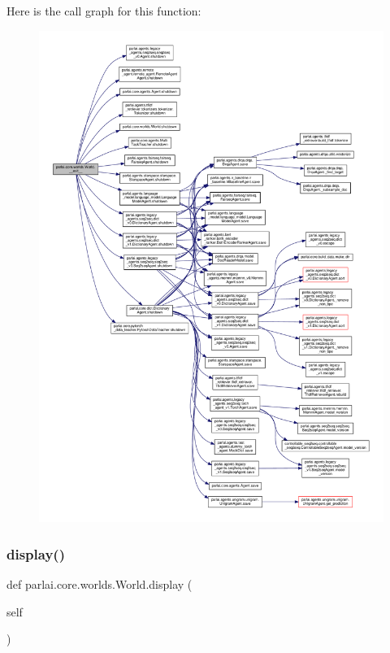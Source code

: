 Here is the call graph for this function\+:
\nopagebreak
\begin{figure}[H]
\begin{center}
\leavevmode
\includegraphics[width=350pt]{classparlai_1_1core_1_1worlds_1_1World_ae2b8ea006564cbefbe8520f45fb71040_cgraph}
\end{center}
\end{figure}
\mbox{\label{classparlai_1_1core_1_1worlds_1_1World_a147371097765449933ca963215eba603}} 
\subsubsection{\texorpdfstring{display()}{display()}}
{\footnotesize\ttfamily def parlai.\+core.\+worlds.\+World.\+display (\begin{DoxyParamCaption}\item[{}]{self }\end{DoxyParamCaption})}

